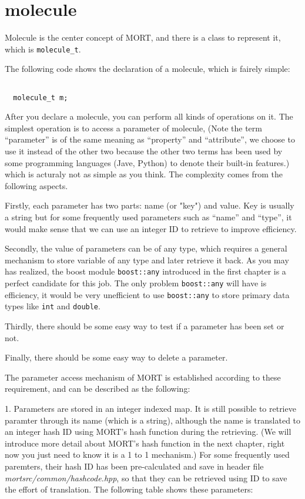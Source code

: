 \documentclass[letterpaper]{book}
\begin{document}
\section{molecule}

  Molecule is the center concept of MORT, and there is a class to represent it, which is
\lstinline$molecule_t$. 

  The following code shows the declaration of a molecule, which is fairely simple:
\begin{lstlisting}

  molecule_t m;

\end{lstlisting}

  After you declare a molecule, you can perform all kinds of operations on it. The simplest
operation is to access a parameter of molecule, (Note the term ``parameter'' is of the 
same meaning as ``property'' and ``attribute'', we choose to use it instead of the other two
because the other two terms has been used by some programming languages (Jave, Python) to 
denote their built-in features.) which is acturaly not as simple as you think. The complexity
comes from the following aspects. 

  Firstly, each parameter has two parts: name (or "key") and value. Key is usually a string
but for some frequently used parameters such as ``name'' and ``type'', it would make sense
that we can use an integer ID to retrieve to improve efficiency.

  Secondly, the value of parameters can be of any type, which requires a general mechanism 
to store variable of any type and later retrieve it back. As you may has realized, the boost
module \lstinline$boost::any$ introduced in the first chapter is a perfect candidate for this
job. The only problem \lstinline$boost::any$ will have is efficiency, it would be very unefficient
to use \lstinline$boost::any$ to store primary data types like \lstinline$int$ and \lstinline$double$.

  Thirdly, there should be some easy way to test if a parameter has been set or not.

  Finally, there should be some easy way to delete a parameter.

  The parameter access mechanism of MORT is established according to these requirement, and can be
described as the following:

  1. Parameters are stored in an integer indexed map. It is still possible to retrieve paramter through its 
name (which is a string), although the name is translated to an integer hash ID using MORT's hash function
during the retrieving. (We will introduce more detail about MORT's hash function in the next chapter, right 
now you just need to know it is a 1 to 1 mechanism.) For some frequently used paremters, their hash ID has
been pre-calculated and save in header file {\it mortsrc/common/hashcode.hpp}, so that they can be retrieved
using ID to save the effort of translation. The following table shows these parameters:
\end{document}

